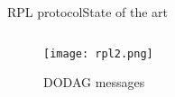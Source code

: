 \begin{frame}{RPL protocol}{State of the art}
\begin{columns}
\begin{column}{0.5\textwidth}
\begin{center}
				\begin{figure}
					\texttt{[image: rpl2.png]}
					\caption{\label{fig:rpl2} DODAG messages}
				\end{figure}
				
			\end{center}
		\end{column}
		
	\end{columns}
	
\end{frame}




